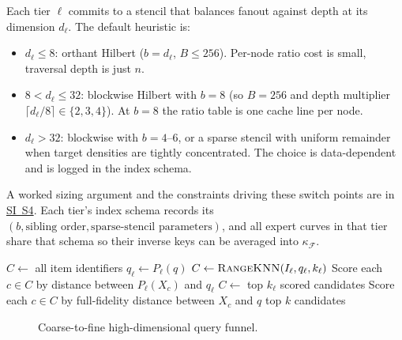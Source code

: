 \documentclass[11pt]{article}
\newcommand{\kappaf}{\kappa_{\mathcal F}}
\begin{document}
Each tier $\ell$ commits to a stencil that balances fanout against depth at its dimension $d_\ell$. The default heuristic is:
\begin{itemize}[leftmargin=1.5em]
    \item $d_\ell\leq 8$: orthant Hilbert ($b=d_\ell$, $B\leq 256$). Per-node ratio cost is small, traversal depth is just $n$.
    \item $8<d_\ell\leq 32$: blockwise Hilbert with $b=8$ (so $B=256$ and depth multiplier $\lceil d_\ell/8\rceil\in\{2,3,4\}$). At $b=8$ the ratio table is one cache line per node.
    \item $d_\ell>32$: blockwise with $b=4$--$6$, or a sparse stencil with uniform remainder when target densities are tightly concentrated. The choice is data-dependent and is logged in the index schema.
\end{itemize}
A worked sizing argument and the constraints driving these switch points are in \hyperref[sec:si-cascade]{SI~S4}. Each tier's index schema records its $(b,\text{sibling order},\text{sparse-stencil parameters})$, and all expert curves in that tier share that schema so their inverse keys can be averaged into $\kappaf$.

\begin{algorithm}[t]
\caption{\textsc{HierarchicalKNN}: cascaded $\rho$-index query}
\label{alg:hierarchical-knn}
\begin{algorithmic}[1]
    \State $C \gets$ all item identifiers
        \State $q_\ell \gets P_\ell(q)$
            \State $C \gets \Call{RangeKNN}{I_\ell,q_\ell,k_\ell}$
        \Else
            \State Score each $c\in C$ by distance between $P_\ell(X_c)$ and $q_\ell$
            \State $C \gets$ top $k_\ell$ scored candidates
        \EndIf
    \EndFor
    \State Score each $c\in C$ by full-fidelity distance between $X_c$ and $q$
    \State \Return top $k$ candidates
\EndProcedure
\end{algorithmic}
\end{algorithm}

\begin{figure}[t]
    \centering
    \caption{Coarse-to-fine high-dimensional query funnel.}
    \label{fig:hierarchical-cascade}
\end{figure}
\end{document}
